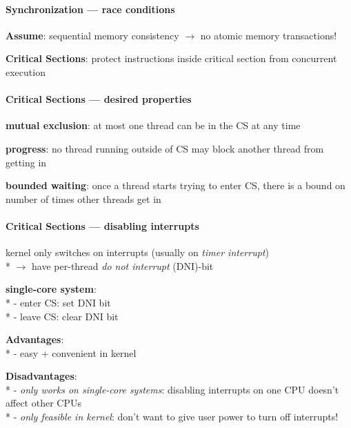 \paragraph{Synchronization --- race conditions}
\begin{items}
  \item \textbf{Assume}: sequential memory consistency \( \to \) no atomic memory transactions!
  \item \textbf{Critical Sections}: protect instructions inside critical section from concurrent execution
\end{items}

\paragraph{Critical Sections --- desired properties}
\begin{items}
  \item \textbf{mutual exclusion}: at most one thread can be in the CS at any time
  \item \textbf{progress}: no thread running outside of CS may block another thread from getting in
  \item \textbf{bounded waiting}: once a thread starts trying to enter CS, there is a bound on number of times other threads get in
\end{items}

\paragraph{Critical Sections --- disabling interrupts}
\begin{items}
  \item kernel only switches on interrupts (usually on \emph{timer interrupt}) \\*
    \( \to \) have per-thread \emph{do not interrupt} (DNI)-bit
  \item \textbf{single-core system}: \\*
    - enter CS: set DNI bit \\*
    - leave CS: clear DNI bit
  \item \textbf{Advantages}: \\*
    - easy + convenient in kernel
  \item \textbf{Disadvantages}: \\*
    - \emph{only works on single-core systems}: disabling interrupts on one CPU doesn't affect other CPUs \\*
    - \emph{only feasible in kernel}: don't want to give user power to turn off interrupts!
\end{items}

